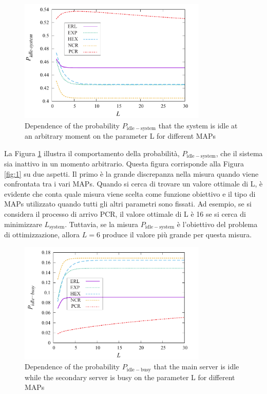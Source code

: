 \documentclass[11pt]{article}
\begin{document}
\clearpage
\begin{figure}[h]
    \centering
    \includegraphics[width=0.8\textwidth]{pSUZiNk.png}
    \caption{ Dependence of the probability $P_{\mathrm{idle-system}}$ that the system is idle at an arbitrary moment on the parameter L for different MAPs}
    \label{fig:3}
\end{figure}

La Figura \ref{fig:3} illustra il comportamento della probabilità,  $P_{\mathrm{idle-system}}$, che il sistema sia inattivo in un momento arbitrario. Questa figura corrisponde alla Figura \ref{fig:1} su due aspetti. Il primo è la grande discrepanza nella misura quando viene confrontata tra i vari MAPs. Quando si cerca di trovare un valore ottimale di L, è evidente che conta quale misura viene scelta come funzione obiettivo e il tipo di MAPs utilizzato quando tutti gli altri parametri sono fissati. Ad esempio, se si considera il processo di arrivo PCR, il valore ottimale di L è 16 se si cerca di minimizzare $L_{\mathrm{system}}$. Tuttavia, se la misura  $P_{\mathrm{idle-system}}$ è l'obiettivo del problema di ottimizzazione, allora $L = $6 produce il valore più grande per questa misura. \vspace{0.4cm}

\begin{figure}[h]
    \centering
    \includegraphics[width=0.8\textwidth]{VrxLKYI.png}
    \caption{ Dependence of the probability $P_{\mathrm{idle-busy}}$ that the main server is idle while the secondary server is busy on the parameter L for different MAPs}
    \label{fig:4}
\end{figure}
\end{document}
